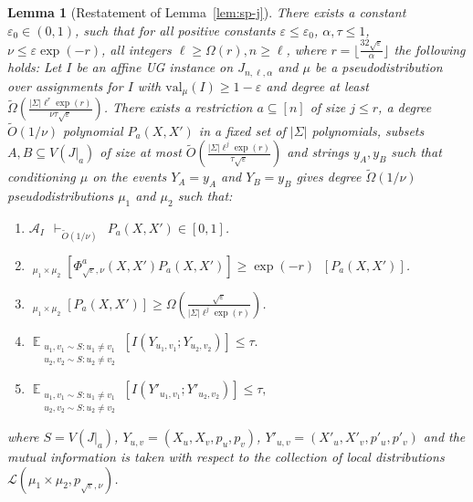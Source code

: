 \documentclass[11pt]{article}
\DeclareMathOperator*{\E}{\mathbb{E}}
\DeclareMathOperator*{\pE}{\widetilde{\mathbb{E}}}
\def \cA {\mathcal{A}}
\def \cL {\mathcal{L}}
\def \tO {\widetilde{O}}
\def \eps {{\varepsilon}}
\def \val {\mathrm{val}}
\newtheorem{lemma}[theorem]{Lemma}
\theoremstyle{definition}
\begin{document}
\begin{lemma}[Restatement of Lemma~\ref{lem:sp-j}]\label{lem:sp-j-restated}
There exists a constant $\eps_0 \in (0,1)$, such that for all positive constants $\eps \leq \eps_0$, $\alpha, \tau \leq 1$, $\nu \leq \eps \exp(-r)$, all integers $\ell \geq \Omega(r), n \geq \ell$, where $r = \lfloor \frac{32\sqrt{\eps}}{\alpha}\rfloor$ the following holds: Let $I$ be an affine UG instance on $J_{n,\ell,\alpha}$ and $\mu$ be a pseudodistribution over assignments for $I$ with $\val_\mu(I) \geq 1-\eps$ and degree at least $\widetilde{\Omega}\left(\frac{|\Sigma|\ell^r\exp(r)}{\nu\tau\sqrt{\eps}}\right)$. There exists a restriction $a \subseteq [n]$ of size $j \leq r$, a degree $\widetilde{O}(1/\nu)$ polynomial $P_a(X,X')$ in a fixed set of $|\Sigma|$ polynomials, subsets $A, B \subseteq V(J|_a)$ of size at most $\tO(\frac{|\Sigma|\ell^j\exp(r)}{\tau\sqrt{\eps}})$ and strings $y_A, y_B$ such that conditioning $\mu$ on the events $Y_A = y_A$ and $Y_B = y_B$ gives degree $\widetilde{\Omega}(1/\nu)$ pseudodistributions $\mu_1$ and $\mu_2$ such that:
\begin{enumerate}
\item $\cA_I  ~~\vdash_{\widetilde{O}(1/\nu)} ~~ P_a(X,X') \in [0,1]$.
\item $\pE_{\mu_1 \times \mu_2}[\Phi^a_{\sqrt{\eps},\nu}(X,X')P_a(X,X')] \geq \exp(-r) \pE[P_a(X,X')]$.
\item $\pE_{\mu_1 \times \mu_2}[P_a(X,X')] \geq \Omega\left(\frac{\sqrt{\eps}}{|\Sigma|\ell^{j}\exp(r)}\right)$.
\item $\E_{\substack{u_1,v_1 \sim S: u_1 \neq v_1\\ u_2,v_2 \sim S: u_2 \neq v_2}}[I(Y_{u_1,v_1};Y_{u_2,v_2})] \leq \tau.$
\item $\E_{\substack{u_1,v_1 \sim S: u_1 \neq v_1\\ u_2,v_2 \sim S: u_2 \neq v_2}}[I(Y'_{u_1,v_1};Y'_{u_2,v_2})] \leq \tau,$
\end{enumerate}
where $S = V(J|_a)$, $Y_{u,v} = (X_u,X_v,p_u,p_v)$, $Y'_{u,v} = (X'_u,X'_v,p'_u,p'_v)$ and the mutual information is taken with respect to the collection of local distributions $\cL(\mu_1 \times \mu_2,p_{\sqrt{\eps},\nu})$. 
\end{lemma}
\end{document}
